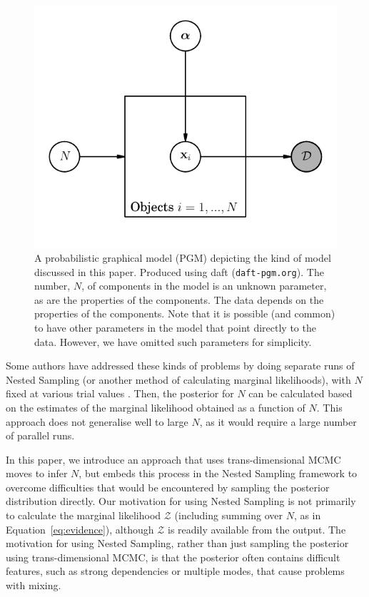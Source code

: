 \documentclass[letterpaper, 11pt]{article}
\begin{document}
\begin{figure}
\begin{center}
\includegraphics{pgm.pdf}
\caption{A probabilistic graphical model (PGM) depicting the kind
of model discussed in this paper. Produced using daft ({\tt daft-pgm.org}).
The number, $N$, of components in the model is an unknown parameter, as are the
properties of the components. The data depends on the properties of the components.
Note that it is possible (and common) to have other parameters in the model
that point directly to the data. However, we have omitted such parameters
for simplicity.
\label{fig:pgm}}
\end{center}
\end{figure}

Some authors have addressed these kinds of problems by
doing separate runs of Nested Sampling
(or another method of calculating marginal likelihoods),
with $N$ fixed at various trial values \citep[e.g.][]{fengji, feroz}.
Then, the posterior for $N$ can be calculated
based on the estimates of the marginal likelihood obtained as a function of $N$.
This approach does not generalise well to large $N$, as it would
require a large number of parallel runs.

In this paper, we introduce an approach that uses trans-dimensional MCMC moves
to infer $N$, but embeds this process in the Nested Sampling framework to
overcome difficulties that would be encountered by sampling the posterior
distribution directly. Our motivation
for using Nested Sampling is not primarily to calculate the marginal
likelihood $\mathcal{Z}$ (including summing over $N$, as in
Equation~\ref{eq:evidence}),
although $\mathcal{Z}$ is readily available from the output.
The motivation for using Nested Sampling, rather than just sampling the
posterior using trans-dimensional MCMC, is that the posterior often contains
difficult features, such as strong dependencies or multiple modes, that cause
problems with mixing.
\end{document}
